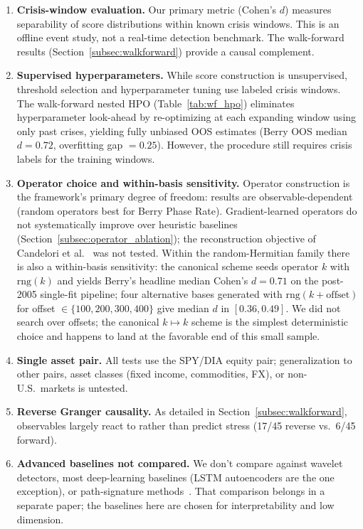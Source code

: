 \documentclass[3p]{elsarticle}
\begin{document}
\begin{enumerate}
\item \textbf{Crisis-window evaluation.}  Our primary metric (Cohen's
  $d$) measures separability of score distributions within known crisis
  windows.  This is an offline event study, not a real-time detection
  benchmark.  The walk-forward results
  (Section~\ref{subsec:walkforward}) provide a causal complement.

\item \textbf{Supervised hyperparameters.}  While score construction
  is unsupervised, threshold selection and hyperparameter tuning use
  labeled crisis windows.  The walk-forward nested HPO
  (Table~\ref{tab:wf_hpo}) eliminates hyperparameter look-ahead
  by re-optimizing at each expanding window using only past crises,
  yielding fully unbiased OOS estimates (Berry OOS median $d = 0.72$,
  overfitting gap $= 0.25$).  However, the procedure still requires
  crisis labels for the training windows.

\item \textbf{Operator choice and within-basis sensitivity.}
  Operator construction is the framework's primary degree of
  freedom: results are observable-dependent (random operators best
  for Berry Phase Rate).  Gradient-learned operators do not
  systematically improve over heuristic baselines
  (Section~\ref{subsec:operator_ablation}); the reconstruction
  objective of Candelori et al.~\cite{candelori2025} was not tested.
  Within the random-Hermitian family there is also a
  within-basis sensitivity: the canonical scheme seeds operator $k$
  with $\mathrm{rng}(k)$ and yields Berry's headline median Cohen's
  $d = 0.71$ on the post-2005 single-fit pipeline; four alternative
  bases generated with $\mathrm{rng}(k + \mathrm{offset})$ for
  offset $\in \{100, 200, 300, 400\}$ give median $d$ in
  $[0.36, 0.49]$.  We did not search over offsets; the canonical
  $k \mapsto k$ scheme is the simplest deterministic choice and
  happens to land at the favorable end of this small sample.

\item \textbf{Single asset pair.}  All tests use the SPY/DIA equity
  pair; generalization to other pairs, asset classes (fixed income,
  commodities, FX), or non-U.S.\ markets is untested.

\item \textbf{Reverse Granger causality.}  As detailed in
  Section~\ref{subsec:walkforward}, observables largely react to
  rather than predict stress (17/45 reverse vs.\ 6/45 forward).

\item \textbf{Advanced baselines not compared.}
  We don't compare against wavelet detectors, most deep-learning
  baselines (LSTM autoencoders are the one exception), or
  path-signature methods~\cite{bronstein2021}.  That comparison
  belongs in a separate paper; the baselines here are chosen for
  interpretability and low dimension.
\end{enumerate}
\end{document}
